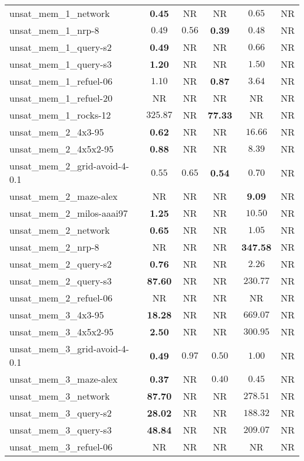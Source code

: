 \begin{tabular}{lccccc}
unsat\_mem\_1\_network & \textbf{0.45} & NR & NR & $0.65$ & NR \\
unsat\_mem\_1\_nrp-8 & $0.49$ & $0.56$ & \textbf{0.39} & $0.48$ & NR \\
unsat\_mem\_1\_query-s2 & \textbf{0.49} & NR & NR & $0.66$ & NR \\
unsat\_mem\_1\_query-s3 & \textbf{1.20} & NR & NR & $1.50$ & NR \\
unsat\_mem\_1\_refuel-06 & $1.10$ & NR & \textbf{0.87} & $3.64$ & NR \\
unsat\_mem\_1\_refuel-20 & NR & NR & NR & NR & NR \\
unsat\_mem\_1\_rocks-12 & $325.87$ & NR & \textbf{77.33} & NR & NR \\
unsat\_mem\_2\_4x3-95 & \textbf{0.62} & NR & NR & $16.66$ & NR \\
unsat\_mem\_2\_4x5x2-95 & \textbf{0.88} & NR & NR & $8.39$ & NR \\
unsat\_mem\_2\_grid-avoid-4-0.1 & $0.55$ & $0.65$ & \textbf{0.54} & $0.70$ & NR \\
unsat\_mem\_2\_maze-alex & NR & NR & NR & \textbf{9.09} & NR \\
unsat\_mem\_2\_milos-aaai97 & \textbf{1.25} & NR & NR & $10.50$ & NR \\
unsat\_mem\_2\_network & \textbf{0.65} & NR & NR & $1.05$ & NR \\
unsat\_mem\_2\_nrp-8 & NR & NR & NR & \textbf{347.58} & NR \\
unsat\_mem\_2\_query-s2 & \textbf{0.76} & NR & NR & $2.26$ & NR \\
unsat\_mem\_2\_query-s3 & \textbf{87.60} & NR & NR & $230.77$ & NR \\
unsat\_mem\_2\_refuel-06 & NR & NR & NR & NR & NR \\
unsat\_mem\_3\_4x3-95 & \textbf{18.28} & NR & NR & $669.07$ & NR \\
unsat\_mem\_3\_4x5x2-95 & \textbf{2.50} & NR & NR & $300.95$ & NR \\
unsat\_mem\_3\_grid-avoid-4-0.1 & \textbf{0.49} & $0.97$ & $0.50$ & $1.00$ & NR \\
unsat\_mem\_3\_maze-alex & \textbf{0.37} & NR & $0.40$ & $0.45$ & NR \\
unsat\_mem\_3\_network & \textbf{87.70} & NR & NR & $278.51$ & NR \\
unsat\_mem\_3\_query-s2 & \textbf{28.02} & NR & NR & $188.32$ & NR \\
unsat\_mem\_3\_query-s3 & \textbf{48.84} & NR & NR & $209.07$ & NR \\
unsat\_mem\_3\_refuel-06 & NR & NR & NR & NR & NR \\

\end{tabular}
